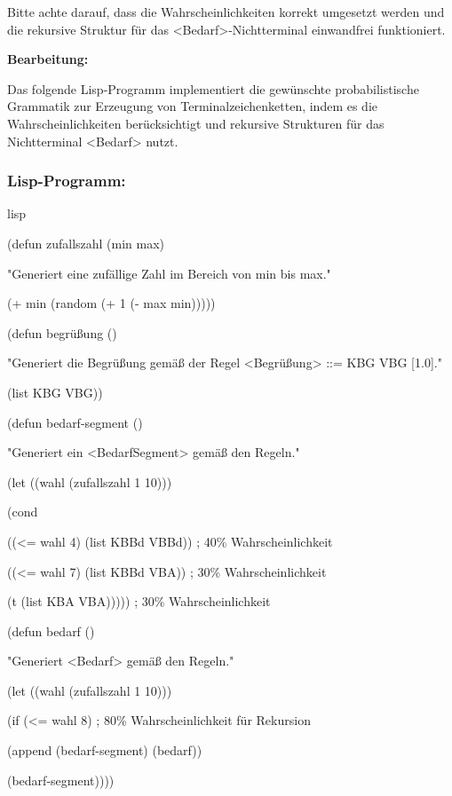 \documentclass[
]{article}
\begin{document}
Bitte achte darauf, dass die Wahrscheinlichkeiten korrekt umgesetzt
werden und die rekursive Struktur für das
\textless Bedarf\textgreater-Nichtterminal einwandfrei funktioniert.

\textbf{Bearbeitung:}

Das folgende Lisp-Programm implementiert die gewünschte probabilistische
Grammatik zur Erzeugung von Terminalzeichenketten, indem es die
Wahrscheinlichkeiten berücksichtigt und rekursive Strukturen für das
Nichtterminal \textless Bedarf\textgreater{} nutzt.

\subsubsection{\texorpdfstring{\textbf{Lisp-Programm:}}{Lisp-Programm:}}\label{lisp-programm}

lisp

(defun zufallszahl (min max)

"Generiert eine zufällige Zahl im Bereich von min bis max."

(+ min (random (+ 1 (- max min)))))

(defun begrüßung ()

"Generiert die Begrüßung gemäß der Regel
\textless Begrüßung\textgreater{} ::= KBG VBG {[}1.0{]}."

(list \textquotesingle KBG \textquotesingle VBG))

(defun bedarf-segment ()

"Generiert ein \textless BedarfSegment\textgreater{} gemäß den Regeln."

(let ((wahl (zufallszahl 1 10)))

(cond

((\textless= wahl 4) (list \textquotesingle KBBd \textquotesingle VBBd))
; 40\% Wahrscheinlichkeit

((\textless= wahl 7) (list \textquotesingle KBBd \textquotesingle VBA))
; 30\% Wahrscheinlichkeit

(t (list \textquotesingle KBA \textquotesingle VBA))))) ; 30\%
Wahrscheinlichkeit

(defun bedarf ()

"Generiert \textless Bedarf\textgreater{} gemäß den Regeln."

(let ((wahl (zufallszahl 1 10)))

(if (\textless= wahl 8) ; 80\% Wahrscheinlichkeit für Rekursion

(append (bedarf-segment) (bedarf))

(bedarf-segment))))
\end{document}

